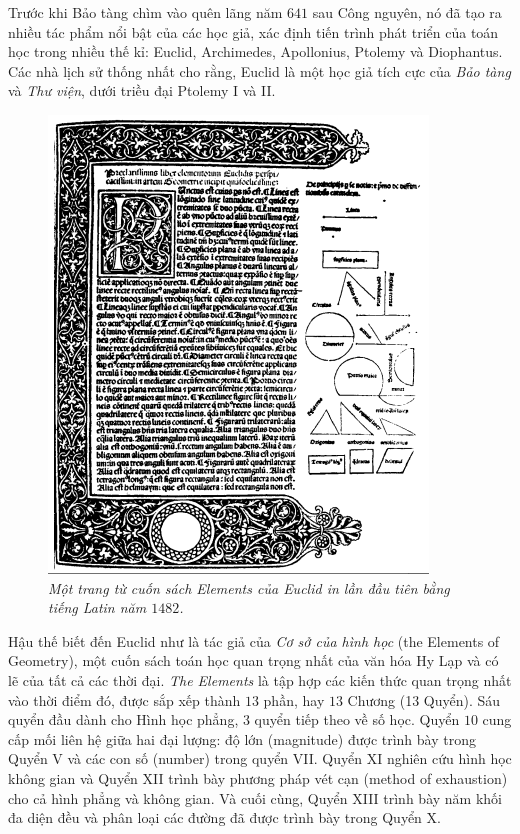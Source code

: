 \begin{multicols}{2}
	\vskip 0.1cm
	Trước khi Bảo tàng chìm vào quên lãng năm $641$ sau Công nguyên, nó đã tạo ra nhiều tác phẩm nổi bật của các học giả, xác định tiến trình phát triển của toán học trong nhiều thế kỉ: Euclid, Archimedes, Apollonius, Ptolemy và Diophantus.
	\vskip 0.1cm
	Các nhà lịch sử thống nhất cho rằng, Euclid là một học giả tích cực của \textit{Bảo tàng} và \textit{Thư viện}, dưới triều đại Ptolemy I và II. 
	\begin{figure}[H]
		\vspace*{-5pt}
		\centering
		\captionsetup{labelformat= empty, justification=centering}
		\includegraphics[width= 1\linewidth]{2}
		\caption{\small\textit{\color{lichsutoanhoc}Một trang từ cuốn sách Elements của Euclid in lần đầu tiên bằng tiếng Latin năm $1482$.}}
		\vspace*{-10pt}
	\end{figure} 
	Hậu thế biết đến Euclid như là tác giả của \textit{Cơ sở của hình học} (the Elements of Geometry), một cuốn sách toán học quan trọng nhất của văn hóa Hy Lạp và có lẽ của tất cả các thời đại. \textit{The Elements} là tập hợp các kiến thức quan trọng nhất vào thời điểm đó, được sắp xếp thành $13$ phần, hay $13$ Chương (1$3$ Quyển). Sáu quyển đầu dành cho Hình học phẳng, 3 quyển tiếp theo về số học. Quyển $10$ cung cấp mối liên hệ giữa hai đại lượng: độ lớn (magnitude) được trình bày trong Quyển V và các con số (number) trong quyển VII. Quyển XI nghiên cứu hình học không gian và Quyển XII trình bày phương pháp vét cạn (method of exhaustion) cho cả hình phẳng và không gian. Và cuối cùng, Quyển XIII trình bày năm khối đa diện đều và phân loại các đường đã được trình bày trong Quyển X.   

\end{multicols}
